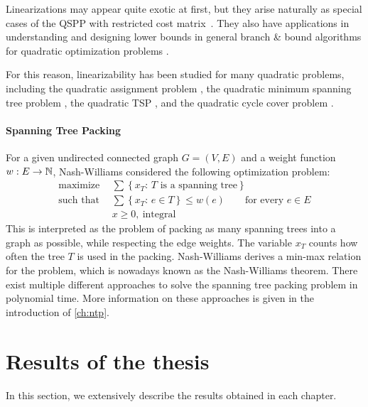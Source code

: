 Linearizations may appear quite exotic at first, but they arise naturally as special cases of the QSPP with restricted cost matrix~\cite{huSo2018}. They also have applications in understanding and designing lower bounds in general branch \& bound algorithms for quadratic optimization problems \cite{huSo2021}. 

For this reason, linearizability has been studied for many quadratic problems, including the quadratic assignment problem
 \cite{CeDeWo2016,Erdogan2006,ErTa2007,ErTa2011,kabadi2011n,punnen2013linear,waddellcharacterizing}, 
 the quadratic minimum spanning tree problem \cite{CuPu2018,sotirov2021quadratic},   the quadratic TSP \cite{PuWaWo2017}, and  the quadratic cycle cover problem \cite{deMeSo2020}.  

\paragraph*{Spanning Tree Packing}
For a given undirected connected graph $G=(V,E)$ and a weight function $w:E \to \mathbb{N}$,
Nash-Williams \cite{Nash-Williams1961} considered the following optimization problem:
\begin{align*}
\text{maximize}~~ &\sum\left\{x_T:\,\text{$T$ is a spanning tree} \right\} 
\\
\text{such that}~~&\sum\left\{x_T:\,e\in T\right\}\le w(e)\qquad\text{for every $e\in E$}
\\
                 &x\ge0,~\text{integral}
\end{align*}
This is interpreted as the problem of packing as many spanning trees into a graph as possible, while respecting the edge weights. The variable $x_T$ counts how often the tree $T$ is used in the packing. 
Nash-Williams \cite{Nash-Williams1961} derives a min-max relation for the problem, which is nowadays known as the Nash-Williams theorem.
There exist multiple different approaches to solve the spanning tree packing problem in polynomial time. More information on these approaches is given in the introduction of \cref{ch:ntp}.


\section{Results of the thesis}
\label{sec:thesis-results}

In this section, we extensively describe the results obtained in each chapter.

